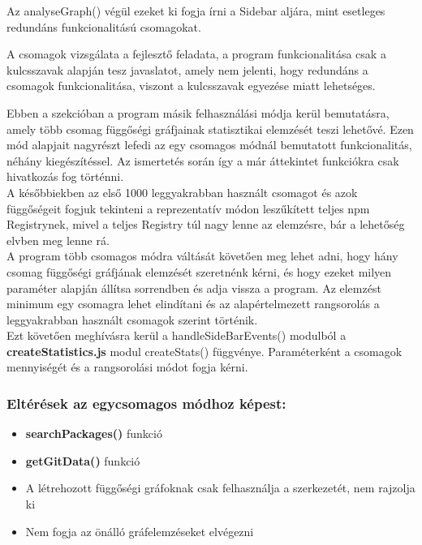 Az analyseGraph() végül ezeket ki fogja írni a Sidebar aljára, mint esetleges redundáns funkcionalitású csomagokat.

A csomagok vizsgálata a fejlesztő feladata, a program funkcionalitása csak a kulcsszavak alapján tesz javaslatot, amely nem jelenti, hogy redundáns a csomagok funkcionalitása, viszont a kulcsszavak egyezése miatt lehetséges.

\pagebreak 


Ebben a szekcióban a program másik felhasználási módja kerül bemutatásra, amely több csomag függőségi gráfjainak statisztikai elemzését teszi lehetővé.
Ezen mód alapjait nagyrészt lefedi az egy csomagos módnál bemutatott funkcionalitás, néhány kiegészítéssel. Az ismertetés során így a már áttekintet funkciókra csak hivatkozás fog történni.\\
 
A későbbiekben az első 1000 leggyakrabban használt csomagot és azok függőségeit fogjuk tekinteni a reprezentatív módon leszűkített teljes npm Registrynek, mivel a teljes Registry túl nagy lenne az elemzésre, bár a lehetőség elvben meg lenne rá.\\

A program több csomagos módra váltását követően meg lehet adni, hogy hány csomag függőségi gráfjának elemzését szeretnénk kérni, és hogy ezeket milyen paraméter alapján állítsa sorrendben és adja vissza a program. Az elemzést minimum egy csomagra lehet elindítani és az alapértelmezett rangsorolás a leggyakrabban használt csomagok szerint történik.\\

Ezt követően meghívásra kerül a handleSideBarEvents() modulból a \textbf{createStatistics.js} modul createStats() függvénye. Paraméterként a csomagok mennyiségét és a rangsorolási módot fogja kérni.

\subsubsection{Eltérések az egycsomagos módhoz képest:}

\begin{itemize}
	\item \textbf{searchPackages()} funkció
	\item \textbf{getGitData()} funkció
	\item A létrehozott függőségi gráfoknak csak felhasználja a szerkezetét, nem rajzolja ki
	\item Nem fogja az önálló gráfelemzéseket elvégezni
\end{itemize}

